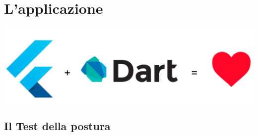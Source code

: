 \documentclass{beamer}
\begin{document}
    \section{L'applicazione}
    \begin{frame}
        \centering
        \includegraphics[scale=0.17]{../figures/flutter_dart.png}
    \end{frame}

    \subsection{Il Test della postura}
\end{document}
